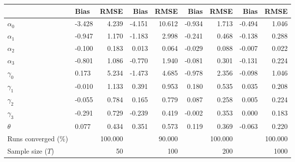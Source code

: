 
\begin{tabular}[t]{llrrrrrrr}
\toprule
  & Bias & RMSE & Bias & RMSE & Bias & RMSE & Bias & RMSE\\
\midrule
$\alpha_{0}$ & -3.428 & 4.239 & -4.151 & 10.612 & -0.934 & 1.713 & -0.494 & 1.046\\
$\alpha_{1}$ & -0.947 & 1.170 & -1.183 & 2.998 & -0.241 & 0.468 & -0.138 & 0.288\\
$\alpha_{2}$ & -0.100 & 0.183 & 0.013 & 0.064 & -0.029 & 0.088 & -0.007 & 0.022\\
$\alpha_{3}$ & -0.801 & 1.086 & -0.770 & 1.940 & -0.081 & 0.301 & -0.131 & 0.224\\
$\gamma_{0}$ & 0.173 & 5.234 & -1.473 & 4.685 & -0.978 & 2.356 & -0.098 & 1.046\\
$\gamma_{1}$ & -0.010 & 1.133 & 0.391 & 0.953 & 0.180 & 0.535 & 0.035 & 0.208\\
$\gamma_{2}$ & -0.055 & 0.784 & 0.165 & 0.779 & 0.087 & 0.258 & 0.005 & 0.224\\
$\gamma_{3}$ & -0.291 & 0.729 & -0.239 & 0.419 & -0.002 & 0.353 & 0.000 & 0.183\\
$\theta$ & 0.077 & 0.434 & 0.351 & 0.573 & 0.119 & 0.369 & -0.063 & 0.220\\
Runs converged (\%) &  & 100.000 &  & 90.000 &  & 100.000 &  & 100.000\\
Sample size ($T$) &  & 50 &  & 100 &  & 200 &  & 1000\\
\bottomrule
\end{tabular}
